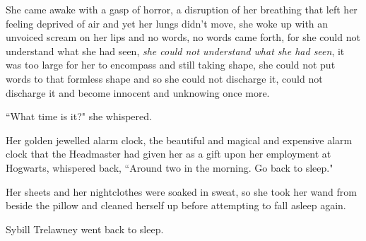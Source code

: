 
She came awake with a gasp of horror, a disruption of her breathing that left her feeling deprived of air and yet her lungs didn't move, she woke up with an unvoiced scream on her lips and no words, no words came forth, for she could not understand what she had seen, \emph{she could not understand what she had seen}, it was too large for her to encompass and still taking shape, she could not put words to that formless shape and so she could not discharge it, could not discharge it and become innocent and unknowing once more.

``What time is it?" she whispered.

Her golden jewelled alarm clock, the beautiful and magical and expensive alarm clock that the Headmaster had given her as a gift upon her employment at Hogwarts, whispered back, ``Around two in the morning. Go back to sleep."

Her sheets and her nightclothes were soaked in sweat, so she took her wand from beside the pillow and cleaned herself up before attempting to fall asleep again.

Sybill Trelawney went back to sleep.

